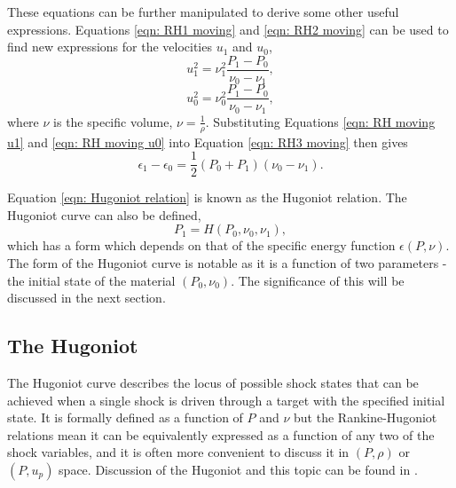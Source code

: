 These equations can be further manipulated to derive some other useful expressions. Equations \ref{eqn: RH1 moving} and \ref{eqn: RH2 moving} can be used to find new expressions for the velocities $u_1$ and $u_0$, 
\begin{equation} u_1^2 = \nu_1^2 \frac{P_1 - P_0}{\nu_0 - \nu_1}, \label{eqn: RH moving u1} \end{equation}
\begin{equation} u_0^2 = \nu_0^2 \frac{P_1 - P_0}{\nu_0 - \nu_1}, \label{eqn: RH moving u0} \end{equation}
where $\nu$ is the specific volume, $\nu = \frac{1}{\rho}$. Substituting Equations \ref{eqn: RH moving u1} and \ref{eqn: RH moving u0} into Equation \ref{eqn: RH3 moving} then gives
\begin{equation} \epsilon_1 - \epsilon_0 = \frac{1}{2}(P_0 + P_1)(\nu_0 - \nu_1).\label{eqn: Hugoniot relation} \end{equation}

Equation \ref{eqn: Hugoniot relation} is known as the Hugoniot relation. The Hugoniot curve can also be defined, 
\begin{equation} P_1 = H(P_0, \nu_0, \nu_1), \end{equation}
which has a form which depends on that of the specific energy function $\epsilon(P, \nu)$. The form of the Hugoniot curve is notable as it is a function of two parameters - the initial state of the material $(P_0, \nu_0)$. The significance of this will be discussed in the next section.

\subsection{The Hugoniot} \label{The Hugoniot theory}

The Hugoniot curve describes the locus of possible shock states that can be achieved when a single shock is driven through a target with the specified initial state. It is formally defined as a function of $P$ and $\nu$ but the Rankine-Hugoniot relations mean it can be equivalently expressed as a function of any two of the shock variables, and it is often more convenient to discuss it in $(P, \rho)$ or $(P, u_p)$ space. Discussion of the Hugoniot and this topic can be found in \cite{Forbes2012}.

